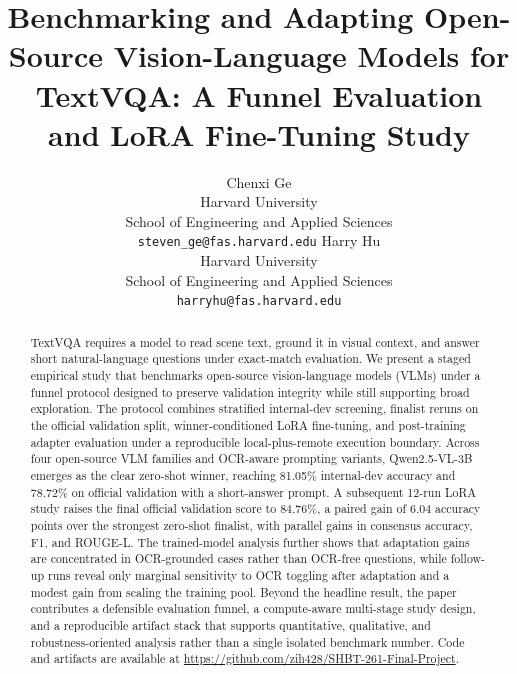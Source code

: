 \documentclass{article}
\title{Benchmarking and Adapting Open-Source Vision-Language Models for TextVQA: A Funnel Evaluation and LoRA Fine-Tuning Study}
\author{%
  Chenxi Ge \\
  Harvard University \\
  School of Engineering and Applied Sciences \\
  \texttt{steven\_ge@fas.harvard.edu}
  \And
  Harry Hu \\
  Harvard University \\
  School of Engineering and Applied Sciences \\
  \texttt{harryhu@fas.harvard.edu}
}
\begin{document}
\maketitle

\begin{abstract}
TextVQA requires a model to read scene text, ground it in visual context, and answer short natural-language questions under exact-match evaluation. We present a staged empirical study that benchmarks open-source vision-language models (VLMs) under a funnel protocol designed to preserve validation integrity while still supporting broad exploration. The protocol combines stratified internal-dev screening, finalist reruns on the official validation split, winner-conditioned LoRA fine-tuning, and post-training adapter evaluation under a reproducible local-plus-remote execution boundary. Across four open-source VLM families and OCR-aware prompting variants, Qwen2.5-VL-3B emerges as the clear zero-shot winner, reaching 81.05\% internal-dev accuracy and 78.72\% on official validation with a short-answer prompt. A subsequent 12-run LoRA study raises the final official validation score to 84.76\%, a paired gain of 6.04 accuracy points over the strongest zero-shot finalist, with parallel gains in consensus accuracy, F1, and ROUGE-L. The trained-model analysis further shows that adaptation gains are concentrated in OCR-grounded cases rather than OCR-free questions, while follow-up runs reveal only marginal sensitivity to OCR toggling after adaptation and a modest gain from scaling the training pool. Beyond the headline result, the paper contributes a defensible evaluation funnel, a compute-aware multi-stage study design, and a reproducible artifact stack that supports quantitative, qualitative, and robustness-oriented analysis rather than a single isolated benchmark number. Code and artifacts are available at \url{https://github.com/zih428/SHBT-261-Final-Project}.
\end{abstract}











\clearpage
\appendix

\end{document}
